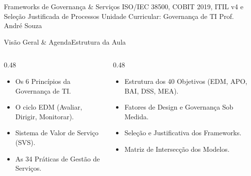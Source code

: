 
\senaicover
  {Frameworks de Governança \& Serviços}
  {ISO/IEC 38500, COBIT 2019, ITIL v4 e Seleção Justificada de Processos}
  {Unidade Curricular: Governança de TI}
  {Prof. André Souza}

\begin{senaiframe}{Visão Geral \& Agenda}{Estrutura da Aula}
  \begin{columns}[t]
    \begin{column}{0.48\textwidth}
      \begin{tcolorbox}[senaibluecard, title={1. ISO/IEC 38500}]
        \begin{itemize}
          \item Os 6 Princípios da Governança de TI.
          \item O ciclo EDM (Avaliar, Dirigir, Monitorar).
        \end{itemize}
      \end{tcolorbox}
      \vspace{4pt}
      \begin{tcolorbox}[senaiambercard, title={3. ITIL v4}]
        \begin{itemize}
          \item Sistema de Valor de Serviço (SVS).
          \item As 34 Práticas de Gestão de Serviços.
        \end{itemize}
      \end{tcolorbox}
    \end{column}
    \begin{column}{0.48\textwidth}
      \begin{tcolorbox}[senairedcard, title={2. COBIT 2019}]
        \begin{itemize}
          \item Estrutura dos 40 Objetivos (EDM, APO, BAI, DSS, MEA).
          \item Fatores de Design e Governança Sob Medida.
        \end{itemize}
      \end{tcolorbox}
      \vspace{4pt}
      \begin{tcolorbox}[senaigreencard, title={4. Capítulo 7 do PDGTI}]
        \begin{itemize}
          \item Seleção e Justificativa dos Frameworks.
          \item Matriz de Intersecção dos Modelos.
        \end{itemize}
      \end{tcolorbox}
    \end{column}
  \end{columns}
\end{senaiframe}

